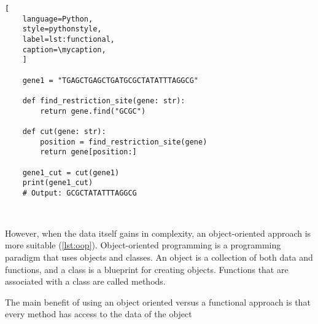 \def\mycaption{Example of functional programming in Python. The code
    defines three functions: ``\texttt{create\_person}'',
    ``\texttt{say\_hello}'', and ``\texttt{introduce}''.
    ``\texttt{create\_person}'' creates a dictionary representing a person,
    ``\texttt{say\_hello}'' prints a greeting, and ``\texttt{introduce}''
    uses the other two functions to introduce a person.}
\begin{lstlisting}[
    language=Python,
    style=pythonstyle,
    label=lst:functional,
    caption=\mycaption,
    ]
    
    gene1 = "TGAGCTGAGCTGATGCGCTATATTTAGGCG"
    
    def find_restriction_site(gene: str):
        return gene.find("GCGC")
    
    def cut(gene: str):
        position = find_restriction_site(gene)
        return gene[position:]   
        
    gene1_cut = cut(gene1)
    print(gene1_cut)
    # Output: GCGCTATATTTAGGCG
    
    
\end{lstlisting}





However, when the data itself gains in complexity, an
object-oriented approach is more suitable (\autoref{lst:oop}). Object-oriented programming
is a programming paradigm that uses objects and classes. An object is a
collection of both data and functions, and a class is a blueprint for
creating objects. Functions that are associated with a class are called
methods.

The main benefit of using an object oriented versus a
functional approach is that every method has access to the data of the
object

